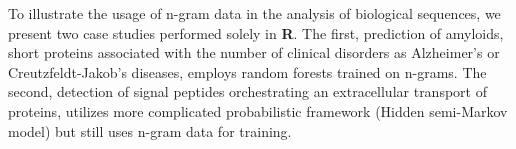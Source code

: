 \documentclass[doc.tex]{subfiles}
\begin{document}
To illustrate the usage of n-gram data in the analysis of biological
sequences, we present two case studies performed solely in \textbf{R}.
The first, prediction of amyloids, short proteins associated with the
number of clinical disorders as Alzheimer's or Creutzfeldt-Jakob's
diseases, employs random forests trained on n-grams. The second,
detection of signal peptides orchestrating an extracellular transport of
proteins, utilizes more complicated probabilistic framework (Hidden
semi-Markov model) but still uses n-gram data for training.
\end{document}
